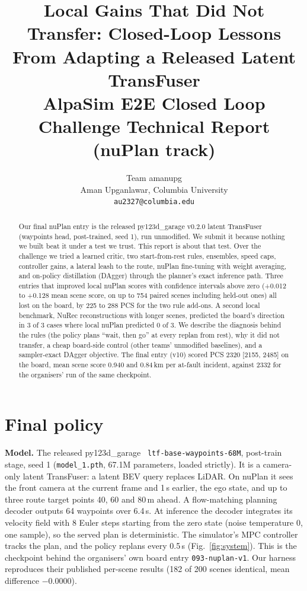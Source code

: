 \documentclass{article}
\title{Local Gains That Did Not Transfer: Closed-Loop Lessons From Adapting a Released Latent TransFuser\\
\large AlpaSim E2E Closed Loop Challenge Technical Report (nuPlan track)}
\author{
  Team amanupg \\
  Aman Upganlawar, Columbia University \\
  \texttt{au2327@columbia.edu}
}
\begin{document}
\maketitle

\begin{abstract}
Our final nuPlan entry is the released py123d\_garage v0.2.0 latent TransFuser (waypoints head, post-trained,
seed 1), run unmodified. We submit it because nothing we built beat it under a test we trust. This report is about
that test. Over the challenge we tried a learned critic, two start-from-rest rules, ensembles, speed caps,
controller gains, a lateral leash to the route, nuPlan fine-tuning with weight averaging, and on-policy
distillation (DAgger) through the planner's exact inference path. Three entries that improved local nuPlan scores with confidence intervals above zero
(+0.012 to +0.128 mean scene score, on up to 754 paired scenes including held-out ones) all lost on the board, by
225 to 288 PCS for the two rule add-ons. A second local benchmark, NuRec reconstructions with longer scenes,
predicted the board's direction in 3 of 3 cases where local nuPlan predicted 0 of 3. We describe the diagnosis
behind the rules (the policy plans ``wait, then go'' at every replan from rest), why it did not transfer, a
cheap board-side control (other teams' unmodified baselines), and a sampler-exact DAgger objective.
The final entry (v10) scored PCS 2320 [2155, 2485] on the board, mean scene score 0.940 and 0.84\,km per
at-fault incident, against 2332 for the organisers' run of the same checkpoint.
\end{abstract}

\section{Final policy}
\textbf{Model.} The released py123d\_garage~\cite{py123d} \texttt{ltf-base-waypoints-68M}, post-train stage,
seed 1 (\texttt{model\_1.pth}, 67.1M parameters, loaded strictly). It is a camera-only latent TransFuser: a
latent BEV query replaces LiDAR. On nuPlan it sees the front camera at the current frame and 1\,s earlier, the
ego state, and up to three route target points 40, 60 and 80\,m ahead. A flow-matching planning decoder outputs 64
waypoints over 6.4\,s. At inference the decoder integrates its velocity field with 8 Euler steps starting from the
zero state (noise temperature 0, one sample), so the served plan is deterministic. The simulator's MPC controller
tracks the plan, and the policy replans every 0.5\,s (Fig.~\ref{fig:system}). This is the checkpoint behind the
organisers' own board entry \texttt{093-nuplan-v1}. Our harness reproduces their published per-scene results
(182 of 200 scenes identical, mean difference $-0.0000$).
\end{document}
